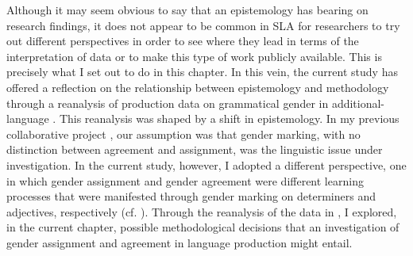 \documentclass[output=paper,colorlinks,citecolor=brown,modfonts,nonflat]{../langscibook}
\begin{document}
Although it may seem obvious to say that an epistemology has bearing on research findings, it does not appear to be common in SLA for researchers to try out different perspectives in order to see where they lead in terms of the interpretation of data or to make this type of work publicly available. This is precisely what I set out to do in this chapter. In this vein, the current study has offered a reflection on the relationship between epistemology and methodology through a reanalysis of production data on grammatical gender in additional-language . This reanalysis was shaped by a shift in epistemology. In my previous collaborative project \citep{GudmestadEtAl2019}, our assumption was that gender marking, with no distinction between agreement and assignment, was the linguistic issue under investigation. In the current study, however, I adopted a different perspective, one in which gender assignment and gender agreement were different learning processes that were manifested through gender marking on determiners and adjectives, respectively (cf. \citealt{Alarcón2010,KupischEtAl2013}). Through the reanalysis of the data in \citeauthor{GudmestadEtAl2019}, I explored, in the current chapter, possible methodological decisions that an investigation of gender assignment and agreement in language production might entail. 
\end{document}
